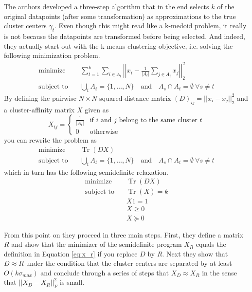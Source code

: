 \documentclass[10pt,a4paper]{article}
\DeclareMathOperator{\Tr}{Tr}
\begin{document}
The authors developed a three-step algorithm that in the end selects $k$ of the original datapoints (after some transformation) as approximations to the true cluster centers $\gamma_{t}$.
Even though this might read like a k-medoid problem, it really is not because the datapoints are transformed before being selected.
And indeed, they actually start out with the k-means clustering objective, i.e. solving the following minimization problem.
\begin{align*}
  \text{minimize} \quad & \sum_{t = 1}^{k} \sum_{i \in A_{t}} \left|\left| x_{i} - \frac{1}{|A_{t}|} \sum_{j \in A_{t}} x_{j} \right|\right|_{2}^{2}\\
  \text{subject to} \quad & \bigcup_{t} A_{t} = \{ 1, \dots, N \} \quad \text{and} \quad A_{s} \cap A_{t} = \emptyset~\forall s \ne t
\end{align*}
By defining the pairwise $N \times N$ squared-distance matrix $(D)_{ij} = ||x_{i} - x_{j}||_{2}^{2}$ and a cluster-affinity matrix $X$ given as
\begin{equation}
  X_{ij} = \begin{cases}
    \frac{1}{|A_{t}|} & \text{if $i$ and $j$ belong to the same cluster $t$}\\
    0 & \text{otherwise}
  \end{cases}
  \label{eq:x_r}
\end{equation}
you can rewrite the problem as
\begin{align*}
  \text{minimize} \quad & \Tr(DX)\\
  \text{subject to} \quad & \bigcup_{t} A_{t} = \{ 1, \dots, N \} \quad \text{and} \quad A_{s} \cap A_{t} = \emptyset~\forall s \ne t
\end{align*}
which in turn has the following semidefinite relaxation.
\begin{align*}
  \text{minimize} \quad & \Tr(DX)\\
  \text{subject to} \quad & \Tr(X) = k\\
                        & X1 = 1\\
                        & X \ge 0\\
                        & X \succeq 0
\end{align*}

From this point on they proceed in three main steps.
First, they define a matrix $R$ and show that the minimizer of the semidefinite program $X_{R}$ equals the definition in Equation \eqref{eq:x_r} if you replace $D$ by $R$.
Next they show that $D \approx R$ under the condition that the cluster centers are separated by at least $O(k\sigma_{max})$ and conclude through a series of steps that $X_{D} \approx X_{R}$ in the sense that $||X_{D} - X_{R}||_{F}^{2}$ is small.
\end{document}
